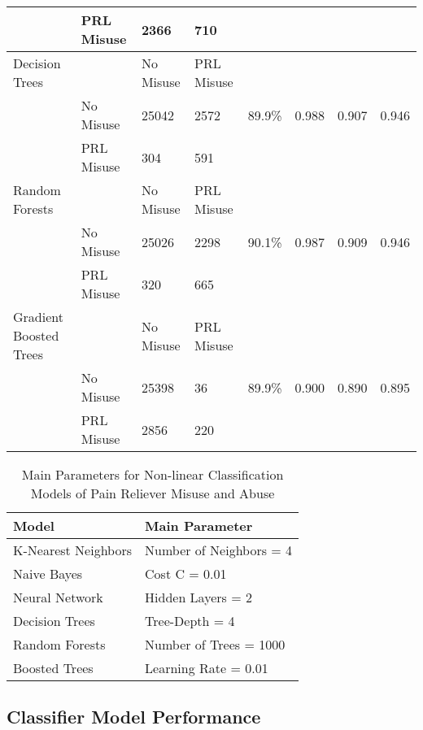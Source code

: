 \documentclass[sigconf]{acmart}
\begin{document}
\begin{table*}[ht]
\begin{tabular}{llllllll}
     & PRL Misuse & 2366 & 710 &  &  &  & \\
    \midrule
    Decision Trees & & No Misuse & PRL Misuse &  &  &  & \\
     & No Misuse & 25042 & 2572 & 89.9\% & 0.988 & 0.907 & 0.946 \\
     & PRL Misuse & 304 & 591 &  &  &  & \\
    \midrule
    Random Forests & & No Misuse & PRL Misuse &  &  &  & \\
     & No Misuse & 25026 & 2298 & 90.1\% & 0.987 & 0.909 & 0.946 \\
     & PRL Misuse & 320 & 665 &  &  &  & \\
    \midrule
    Gradient Boosted Trees & & No Misuse & PRL Misuse &  &  &  & \\
     & No Misuse & 25398 & 36 & 89.9\% & 0.900 & 0.890 & 0.895 \\
     & PRL Misuse & 2856 & 220 &  &  &  & \\
    \bottomrule
  \end{tabular}
\end{table*}


\begin{table}
  \caption{Main Parameters for Non-linear Classification Models of 
  Pain Reliever Misuse and Abuse}
  \label{tab:freq}
  \begin{tabular}{ll}
    \toprule
    Model & Main Parameter \\
    \midrule
    K-Nearest Neighbors & Number of Neighbors = 4 \\
    Naive Bayes & Cost C = 0.01 \\
    Neural Network & Hidden Layers = 2 \\
    Decision Trees & Tree-Depth = 4 \\ 
    Random Forests & Number of Trees = 1000 \\
    Boosted Trees & Learning Rate = 0.01 \\ 
    \bottomrule
  \end{tabular}
\end{table}


\subsection{Classifier Model Performance}
\end{document}
